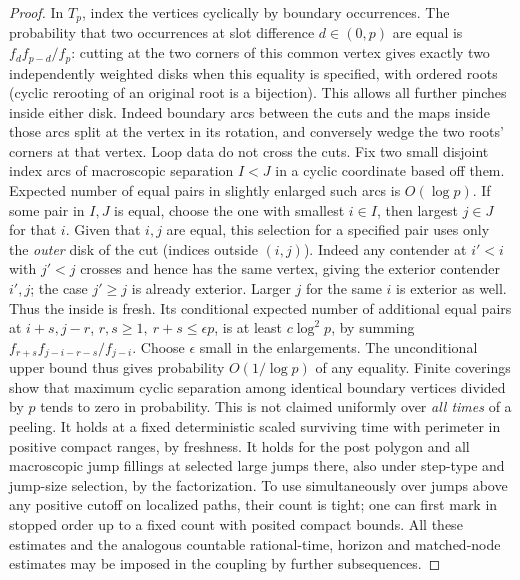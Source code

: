 \begin{proof}\leavevmode

In \(T_p\), index the vertices cyclically by boundary occurrences.
The probability that two occurrences at slot difference \(d\in(0,p)\) are equal is \(f_d f_{p-d}/f_p\): cutting at the two corners of this common vertex gives exactly two independently weighted disks when this equality is specified, with ordered roots (cyclic rerooting of an original root is a bijection).
This allows all further pinches inside either disk.
Indeed boundary arcs between the cuts and the maps inside those arcs split at the vertex in its rotation, and conversely wedge the two roots' corners at that vertex.
Loop data do not cross the cuts.
Fix two small disjoint index arcs of macroscopic separation \(I<J\) in a cyclic coordinate based off them.
Expected number of equal pairs in slightly enlarged such arcs is \(O(\log p)\).
If some pair in \(I,J\) is equal, choose the one with smallest \(i\in I\), then largest \(j\in J\) for that \(i\).
Given that \(i,j\) are equal, this selection for a specified pair uses only the \emph{outer} disk of the cut (indices outside \((i,j)\)).
Indeed any contender at \(i'<i\) with \(j'<j\) crosses and hence has the same vertex, giving the exterior contender \(i',j\); the case \(j'\ge j\) is already exterior.
Larger \(j\) for the same \(i\) is exterior as well.
Thus the inside is fresh.
Its conditional expected number of additional equal pairs at \(i+s,j-r\), \(r,s\ge1,\ r+s\le \epsilon p\), is at least \(c\log^2 p\), by summing \(f_{r+s} f_{j-i-r-s}/f_{j-i}\).
Choose \(\epsilon\) small in the enlargements.
The unconditional upper bound thus gives probability \(O(1/\log p)\) of any equality.
Finite coverings show that maximum cyclic separation among identical boundary vertices divided by \(p\) tends to zero in probability.
This is not claimed uniformly over \emph{all times} of a peeling.
It holds at a fixed deterministic scaled surviving time with perimeter in positive compact ranges, by freshness.
It holds for the post polygon and all macroscopic jump fillings at selected large jumps there, also under step-type and jump-size selection, by the factorization.
To use simultaneously over jumps above any positive cutoff on localized paths, their count is tight; one can first mark in stopped order up to a fixed count with posited compact bounds.
All these estimates and the analogous countable rational-time, horizon and matched-node estimates may be imposed in the coupling by further subsequences.

\end{proof}

